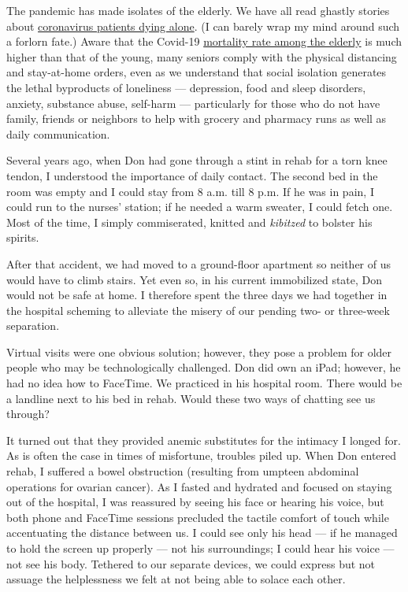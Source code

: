 The pandemic has made isolates of the elderly. We have all read ghastly
stories about
\href{https://www.cnn.com/2020/03/29/world/funerals-dying-alone-coronavirus/index.html}{coronavirus
patients dying alone}. (I can barely wrap my mind around such a forlorn
fate.) Aware that the Covid-19
\href{https://www.statnews.com/2020/03/30/what-explains-coronavirus-lethality-for-elderly/}{mortality
rate among the elderly} is much higher than that of the young, many
seniors comply with the physical distancing and stay-at-home orders,
even as we understand that social isolation generates the lethal
byproducts of loneliness --- depression, food and sleep disorders,
anxiety, substance abuse, self-harm --- particularly for those who do
not have family, friends or neighbors to help with grocery and pharmacy
runs as well as daily communication.

Several years ago, when Don had gone through a stint in rehab for a torn
knee tendon, I understood the importance of daily contact. The second
bed in the room was empty and I could stay from 8 a.m. till 8 p.m. If he
was in pain, I could run to the nurses' station; if he needed a warm
sweater, I could fetch one. Most of the time, I simply commiserated,
knitted and \emph{kibitzed} to bolster his spirits.

After that accident, we had moved to a ground-floor apartment so neither
of us would have to climb stairs. Yet even so, in his current
immobilized state, Don would not be safe at home. I therefore spent the
three days we had together in the hospital scheming to alleviate the
misery of our pending two- or three-week separation.

Virtual visits were one obvious solution; however, they pose a problem
for older people who may be technologically challenged. Don did own an
iPad; however, he had no idea how to FaceTime. We practiced in his
hospital room. There would be a landline next to his bed in rehab. Would
these two ways of chatting see us through?

It turned out that they provided anemic substitutes for the intimacy I
longed for. As is often the case in times of misfortune, troubles piled
up. When Don entered rehab, I suffered a bowel obstruction (resulting
from umpteen abdominal operations for ovarian cancer). As I fasted and
hydrated and focused on staying out of the hospital, I was reassured by
seeing his face or hearing his voice, but both phone and FaceTime
sessions precluded the tactile comfort of touch while accentuating the
distance between us. I could see only his head --- if he managed to hold
the screen up properly --- not his surroundings; I could hear his voice
--- not see his body. Tethered to our separate devices, we could express
but not assuage the helplessness we felt at not being able to solace
each other.

